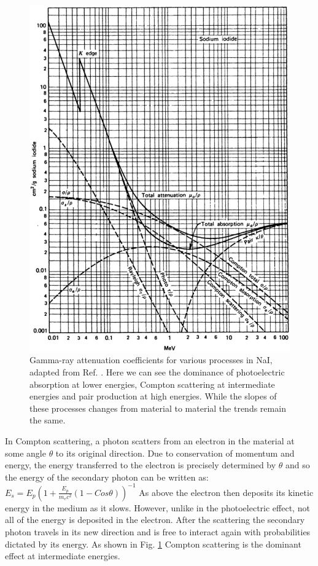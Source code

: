 \begin{figure}[h!]
	\centerline{\includegraphics[height=0.5\textheight]{./img/c3/gamma_interactions_scan.eps}}
	\caption{Gamma-ray attenuation coefficients for various processes in NaI, adapted from Ref. \cite{knollBook}. Here we can see the dominance of photoelectric absorption at lower energies, Compton scattering at intermediate energies and pair production at high energies. While the slopes of these processes changes from material to material the trends remain the same.}
	\label{fig:chp3-gamma-interactions}
\end{figure}

In Compton scattering, a \gr{} photon scatters from an electron in the material at some angle $\theta$ to its original direction\cite{Compton-PhysRev.21.483}. Due to conservation of momentum and energy, the energy transferred to the electron is precisely determined by $\theta$ and so the energy of the secondary photon can be written as: $E_{s}=E_{p}(1+\frac{E_{p}}{m_{e}c^2}(1-Cos\theta))^{-1}$ As above the electron then deposits its kinetic energy in the medium as it slows. However, unlike in the photoelectric effect, not all of the energy is deposited in the electron. After the scattering the secondary photon travels in its new direction and is free to interact again with probabilities dictated by its energy. As shown in Fig. \ref{fig:chp3-gamma-interactions} Compton scattering is the dominant effect at intermediate energies.

